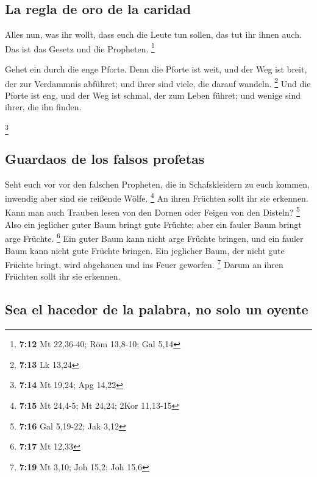 \hypertarget{la-regla-de-oro-de-la-caridad}{%
\subsection{La regla de oro de la
caridad}\label{la-regla-de-oro-de-la-caridad}}

 Alles nun, was ihr wollt, dass euch die Leute tun
sollen, das tut ihr ihnen auch. Das ist das Gesetz und die Propheten.
\footnote{\textbf{7:12} Mt 22,36-40; Röm 13,8-10; Gal 5,14}

 Gehet ein durch die enge Pforte. Denn die Pforte ist
weit, und der Weg ist breit, der zur Verdammnis abführet; und ihrer sind
viele, die darauf wandeln. \footnote{\textbf{7:13} Lk 13,24}
 Und die Pforte ist eng, und der Weg ist schmal, der zum
Leben führet; und wenige sind ihrer, die ihn finden.

\footnote{\textbf{7:14} Mt 19,24; Apg 14,22}

\hypertarget{guardaos-de-los-falsos-profetas}{%
\subsection{Guardaos de los falsos
profetas}\label{guardaos-de-los-falsos-profetas}}

 Seht euch vor vor den falschen Propheten, die in
Schafskleidern zu euch kommen, inwendig aber sind sie reißende Wölfe.
\footnote{\textbf{7:15} Mt 24,4-5; Mt 24,24; 2Kor 11,13-15}
 An ihren Früchten sollt ihr sie erkennen. Kann man auch
Trauben lesen von den Dornen oder Feigen von den Disteln? \footnote{\textbf{7:16}
  Gal 5,19-22; Jak 3,12}  Also ein jeglicher guter Baum
bringt gute Früchte; aber ein fauler Baum bringt arge Früchte.
\footnote{\textbf{7:17} Mt 12,33}  Ein guter Baum kann
nicht arge Früchte bringen, und ein fauler Baum kann nicht gute Früchte
bringen.  Ein jeglicher Baum, der nicht gute Früchte
bringt, wird abgehauen und ins Feuer geworfen. \footnote{\textbf{7:19}
  Mt 3,10; Joh 15,2; Joh 15,6}  Darum an ihren Früchten
sollt ihr sie erkennen.

\hypertarget{sea-el-hacedor-de-la-palabra-no-solo-un-oyente}{%
\subsection{Sea el hacedor de la palabra, no solo un
oyente}\label{sea-el-hacedor-de-la-palabra-no-solo-un-oyente}}

